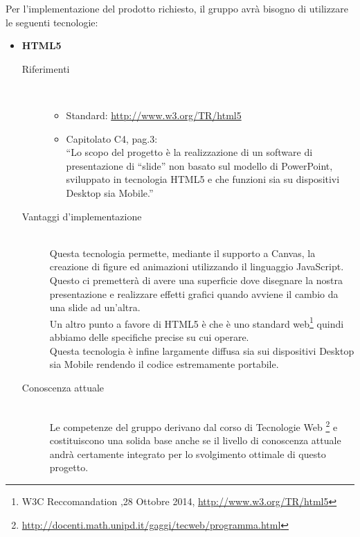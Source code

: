 Per l’implementazione del prodotto richiesto, il gruppo avrà bisogno di utilizzare le seguenti tecnologie:
\begin{itemize}
	\item \textbf{HTML5}
	\begin{description}
		\item[Riferimenti] \hfill \\
		\begin{itemize}
			\item Standard: \url{http://www.w3.org/TR/html5}
			\item Capitolato C4, pag.3:\\
“Lo scopo del progetto è la realizzazione di un software di presentazione di “slide” non basato sul modello di PowerPoint, sviluppato in tecnologia HTML5 e che funzioni sia su dispositivi Desktop sia Mobile.”
		\end{itemize}
		\item[Vantaggi d'implementazione] \hfill \\ Questa tecnologia permette, mediante il supporto a Canvas, la creazione di figure ed animazioni  utilizzando il linguaggio JavaScript. Questo ci premetterà di avere una superficie dove disegnare la nostra presentazione e realizzare effetti grafici quando avviene il cambio da una slide ad un’altra. \\ Un altro punto a favore di HTML5 è che è uno standard web\footnote{W3C Reccomandation ,28 Ottobre 2014, \url{http://www.w3.org/TR/html5}} quindi abbiamo delle specifiche precise su cui operare. \\ Questa tecnologia è infine largamente diffusa sia sui dispositivi Desktop sia Mobile rendendo il codice estremamente portabile.

	\item[Conoscenza attuale] \hfill \\ Le competenze del gruppo \GRUPPO  derivano dal corso di Tecnologie Web \footnote{\url{http://docenti.math.unipd.it/gaggi/tecweb/programma.html}} e costituiscono una solida base anche se il livello di conoscenza attuale andrà certamente integrato per lo svolgimento ottimale di questo progetto.


\end{description}
\end{itemize}
